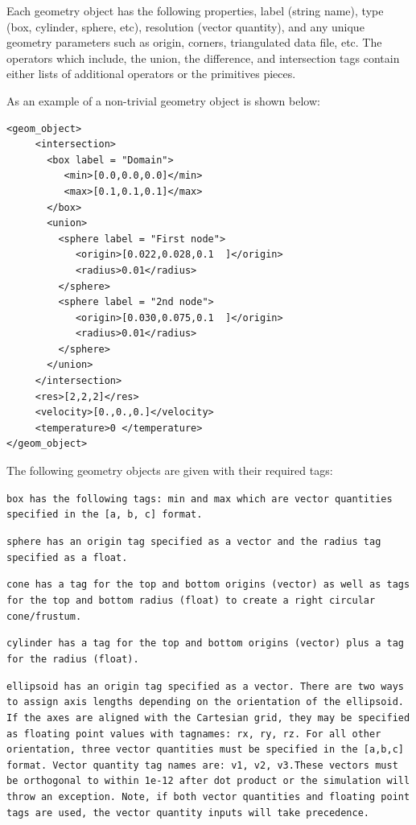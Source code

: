 Each geometry object has the following properties, label (string
name), type (box, cylinder, sphere, etc), resolution (vector
quantity), and any unique geometry parameters such as origin, corners,
triangulated data file, etc.  The operators which include, the union,
the difference, and intersection tags contain either lists of
additional operators or the primitives pieces.

As an example of a non-trivial geometry object is shown below:

\begin{Verbatim}[fontsize=\footnotesize]
<geom_object>
     <intersection>
       <box label = "Domain">
          <min>[0.0,0.0,0.0]</min>
          <max>[0.1,0.1,0.1]</max>
       </box>
       <union>
         <sphere label = "First node">
            <origin>[0.022,0.028,0.1  ]</origin>
            <radius>0.01</radius>
         </sphere>
         <sphere label = "2nd node">
            <origin>[0.030,0.075,0.1  ]</origin>
            <radius>0.01</radius>
         </sphere>
       </union>
     </intersection>
     <res>[2,2,2]</res>
     <velocity>[0.,0.,0.]</velocity>
     <temperature>0 </temperature>
</geom_object>
\end{Verbatim}

The following geometry objects are given with their required tags:

\tt box \normalfont has the following tags: min and max which are
vector quantities specified in the \tt [a, b, c] \normalfont format.

\tt sphere \normalfont has an origin tag specified as a vector and the
radius tag specified as a float.

\tt cone \normalfont has a tag for the top and bottom origins (vector)
as well as tags for the top and bottom radius (float) to create a
right circular cone/frustum.

\tt cylinder \normalfont has a tag for the top and bottom origins
(vector) plus a tag for the radius (float).

\tt ellipsoid \normalfont has an origin tag specified as a vector.  There are
two ways to assign axis lengths depending on the orientation of the ellipsoid.
If the axes are aligned with the Cartesian grid, they may be specified as
floating point values with tagnames: rx, ry, rz.  For all other orientation,
three vector quantities must be specified in the \tt [a,b,c] \normalfont format.
Vector quantity tag names are: v1, v2, v3.These vectors must be orthogonal
to within 1e-12 after dot product or the simulation will throw an exception.
Note, if both vector quantities and floating point tags are used,
the vector quantity inputs will take precedence.

